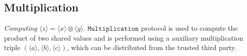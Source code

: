 \documentclass[letterpaper]{article} %
\begin{document}
    \subsection{Multiplication}
    \emph{Computing} $ \langle z\rangle  = \langle x\rangle  \otimes \langle y\rangle $.
    $\mathtt{Multiplication}$ protocol is used to compute the product of two shared values
    and is performed using a auxiliary multiplication triple
    $(\langle a\rangle,\langle b\rangle,\langle c\rangle)$,
    which can be distributed from the trusted third party.
    \begin{figure}[ht]
\end{figure}
\end{document}
